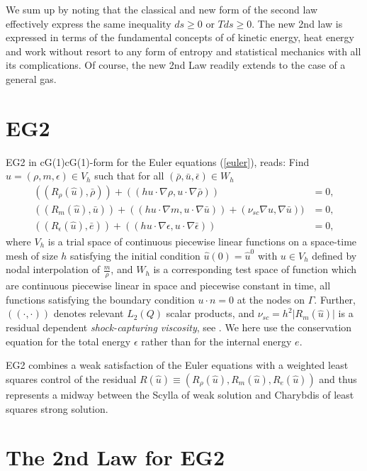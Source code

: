 We sum up by noting that the classical and new form of the second
law effectively express the same inequality $ds\ge 0$ or $Tds\ge 0$.
The new 2nd law is expressed in terms of the fundamental concepts of
of kinetic energy, heat energy and work without resort to any 
form of entropy and  statistical mechanics with all its 
complications. Of course, the new 2nd Law readily extends to
the case of a general gas.

\section{EG2}

EG2 in cG(1)cG(1)-form for the Euler equations (\ref{euler}), reads: 
Find $\hat u =(\rho ,m,\epsilon )\in V_h$ such that for all 
$(\bar\rho ,\bar u,\bar\epsilon )\in W_h$
\begin{equation}\label{cG1cG1}
\begin{split}
((R_\rho (\hat u),\bar\rho ))+((h u\cdot\nabla\rho , 
u\cdot\nabla\bar\rho ))&=0,\\
((R_m(\hat u),\bar u))+
((h u\cdot\nabla m, u\cdot\nabla\bar u))+(\nu_{sc}\nabla u,\nabla\bar u))&=0,\\
((R_\epsilon (\hat u),\bar e))+
((h u\cdot\nabla \epsilon ,u\cdot\nabla\bar\epsilon ))&=0,
\end{split}
\end{equation}
where $V_h$ is a trial space of continuous piecewise linear 
functions on a space-time mesh of size $h$ satisfying the initial
condition $\hat u(0)=\hat u^0$ with $u\in V_h$ defined by
nodal interpolation of $\frac{m}{\rho}$, and $W_h$ 
is a corresponding test space of function which are
continuous piecewise linear in space and piecewise constant in time,
all functions satisfying the boundary condition $u\cdot n=0$ at the 
nodes on
$\Gamma$. Further, $((\cdot ,\cdot ))$  
denotes relevant  
$L_2(Q)$ scalar products, and $\nu_{sc}=h^2\vert R_m(\hat u)\vert$ is
a residual dependent \emph{shock-capturing viscosity}, see \cite{nazarov2009}. 
We here use the conservation equation
for the total energy $\epsilon$ rather than for the internal energy
$e$.

EG2 combines a weak satisfaction of the Euler equations
with a weighted least squares control of the residual $R(\hat u)
\equiv (R_\rho (\hat u) ,R_m(\hat u),R_e(\hat u))$ and
thus represents a midway between the Scylla of weak solution and
Charybdis of least squares strong solution. 



\section{The 2nd Law for EG2}

